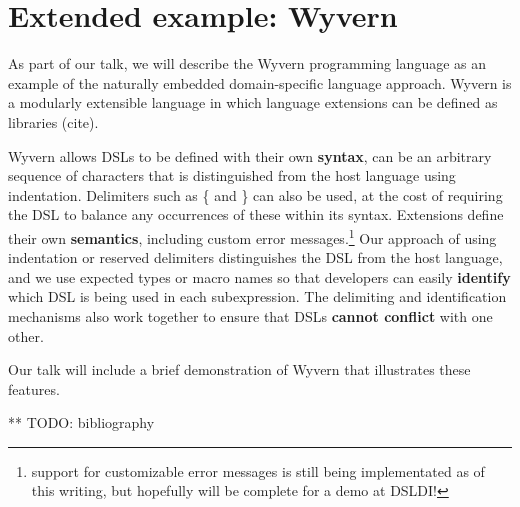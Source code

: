 \documentclass[preprint]{sigplanconf}
\begin{document}
\section{Extended example: Wyvern}

As part of our talk, we will describe the Wyvern programming language
as an example of the naturally embedded domain-specific language
approach.  Wyvern is a modularly extensible language in which language
extensions can be defined as libraries (cite).

Wyvern allows DSLs to be defined with their own \textbf{syntax}, can be
an arbitrary sequence of characters that is distinguished from the host
language using indentation.  Delimiters such as \{ and \} can also be
used, at the cost of requiring the DSL to balance any occurrences of
these within its syntax.  Extensions define their own \textbf{semantics},
including custom error messages.\footnote{support for customizable
error messages is still being implementated as of this writing, but
hopefully will be complete for a demo at DSLDI!}  Our approach of
using indentation or reserved delimiters distinguishes the DSL from
the host language, and we use expected types or macro names so that
developers can easily \textbf{identify} which DSL is being used in each
subexpression.  The delimiting and identification mechanisms also work
together to ensure that DSLs \textbf{cannot conflict} with one other.

Our talk will include a brief demonstration of Wyvern that illustrates
these features.

** TODO: bibliography
\end{document}
